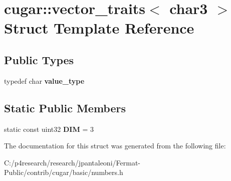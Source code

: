 \hypertarget{structcugar_1_1vector__traits_3_01char3_01_4}{}\section{cugar\+:\+:vector\+\_\+traits$<$ char3 $>$ Struct Template Reference}
\label{structcugar_1_1vector__traits_3_01char3_01_4}
\subsection*{Public Types}
\begin{DoxyCompactItemize}
\item 
\mbox{\label{structcugar_1_1vector__traits_3_01char3_01_4_ab3c1894f630b6a4c30703ee65a0a54b6}} 
typedef char {\bfseries value\+\_\+type}
\end{DoxyCompactItemize}
\subsection*{Static Public Members}
\begin{DoxyCompactItemize}
\item 
\mbox{\label{structcugar_1_1vector__traits_3_01char3_01_4_a5bb8b3b189b219c7173f7841dc8fee49}} 
static const uint32 {\bfseries D\+IM} = 3
\end{DoxyCompactItemize}


The documentation for this struct was generated from the following file\+:\begin{DoxyCompactItemize}
\item 
C\+:/p4research/research/jpantaleoni/\+Fermat-\/\+Public/contrib/cugar/basic/numbers.\+h\end{DoxyCompactItemize}
